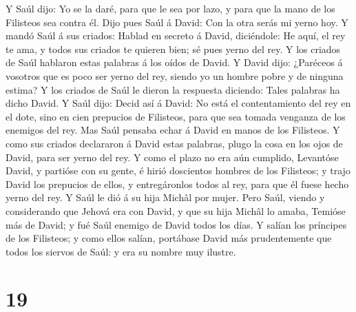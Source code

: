  Y Saúl dijo: Yo se la daré, para que le sea por lazo, y
para que la mano de los Filisteos sea contra él. Dijo pues Saúl á David:
Con la otra serás mi yerno hoy.  Y mandó Saúl á sus
criados: Hablad en secreto á David, diciéndole: He aquí, el rey te ama,
y todos sus criados te quieren bien; sé pues yerno del rey.
 Y los criados de Saúl hablaron estas palabras á los oídos
de David. Y David dijo: ¿Paréceos á vosotros que es poco ser yerno del
rey, siendo yo un hombre pobre y de ninguna estima?  Y los
criados de Saúl le dieron la respuesta diciendo: Tales palabras ha dicho
David.  Y Saúl dijo: Decid así á David: No está el
contentamiento del rey en el dote, sino en cien prepucios de Filisteos,
para que sea tomada venganza de los enemigos del rey. Mas Saúl pensaba
echar á David en manos de los Filisteos.  Y como sus
criados declararon á David estas palabras, plugo la cosa en los ojos de
David, para ser yerno del rey. Y como el plazo no era aún cumplido,
 Levantóse David, y partióse con su gente, é hirió
doscientos hombres de los Filisteos; y trajo David los prepucios de
ellos, y entregáronlos todos al rey, para que él fuese hecho yerno del
rey. Y Saúl le dió á su hija Michâl por mujer.  Pero Saúl,
viendo y considerando que Jehová era con David, y que su hija Michâl lo
amaba,  Temióse más de David; y fué Saúl enemigo de David
todos los días.  Y salían los príncipes de los Filisteos; y
como ellos salían, portábase David más prudentemente que todos los
siervos de Saúl: y era su nombre muy ilustre.

\hypertarget{section-18}{%
\section{19}\label{section-18}}

